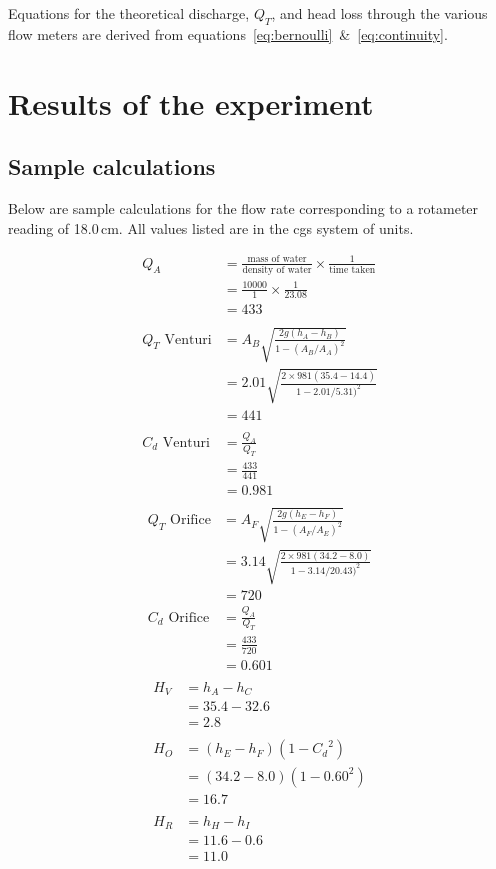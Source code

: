 \documentclass[a4paper]{article}
\begin{document}
Equations for the theoretical discharge, $Q_T$,
and head loss through the various flow meters are derived from 
equations~\eqref{eq:bernoulli}~\&~\eqref{eq:continuity}.

\section{Results of the experiment}
\subsection{Sample calculations}
Below are sample calculations for the flow rate 
corresponding to a rotameter reading of 18.0\,cm.
All values listed are in the cgs system of units.

\begin{align*}
Q_A &= \frac{\text{mass of water}}{\text{density of water}} \times 
       \frac{1}{\text{time taken}} \\
    &= \frac{10000}{1} \times \frac{1}{23.08} \\
    &= 433 \\
\\
Q_T \text{ Venturi} &= A_B \sqrt{\frac{2g(h_A-h_B)}{1-(A_B/A_A)^2}} \\
                    &= 2.01 \sqrt{\frac{2\times981(35.4-14.4)}
                                      {1-2.01/5.31)^2}} \\
                    &= 441 \\
\\
C_d \text{ Venturi} &= \frac{Q_A}{Q_T} \\
                    &= \frac{433}{441} \\
                    &= 0.981 \\
\end{align*}
\begin{align*}
Q_T \text{ Orifice} &= A_F \sqrt{\frac{2g(h_E-h_F)}{1-(A_F/A_E)^2}} \\
                    &= 3.14 \sqrt{\frac{2\times981(34.2-8.0)}
                                      {1-3.14/20.43)^2}} \\
                    &= 720 \\
C_d \text{ Orifice} &= \frac{Q_A}{Q_T} \\
                    &= \frac{433}{720} \\
                    &= 0.601 \\
\end{align*}
\begin{align*}
H_V &= h_A - h_C \\
    &= 35.4 - 32.6 \\
    &= 2.8 \\
\\
H_O &= (h_E - h_F)(1 - {C_d}^2) \\
    &= (34.2 - 8.0)(1 - 0.60^2) \\
    &= 16.7 \\
\\
H_R &= h_H - h_I \\
    &= 11.6 - 0.6 \\
    &= 11.0 \\
\end{align*}
\end{document}
